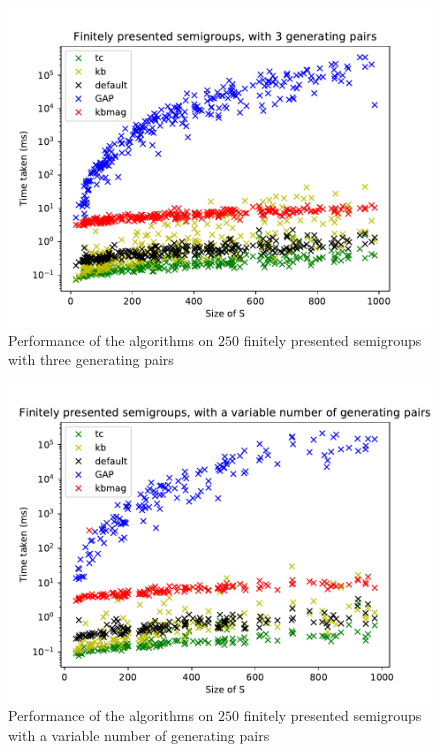 \begin{figure}[h]
  \centering
  \includegraphics[width=\textwidth]{pics/ch-pairs/bench-fp-3p-times}
  \caption{Performance of the algorithms on $250$ finitely presented semigroups
    with three generating pairs}
  \label{fig:bench-fp-3p-times}
\end{figure}

\begin{figure}[h]
  \centering
  \includegraphics[width=\textwidth]{pics/ch-pairs/bench-fp-vp-times}
  \caption{Performance of the algorithms on $250$ finitely presented semigroups
    with a variable number of generating pairs}
  \label{fig:bench-fp-vp-times}
\end{figure}

